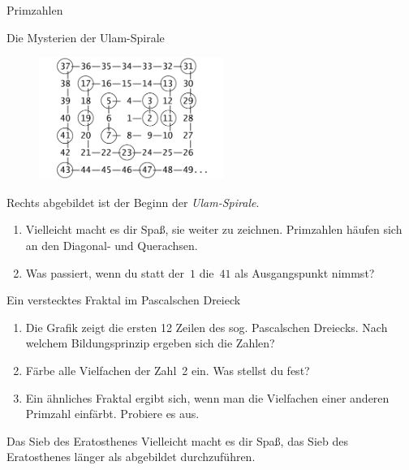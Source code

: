 \documentclass{uebblatt}
\begin{document}
\begin{blatt}{Primzahlen}

\begin{aufgabe}{Die Mysterien der Ulam-Spirale}
\begin{figure}
\vspace*{-1.5cm}
\includegraphics[width=6cm]{ulam}
\end{figure}
Rechts abgebildet ist der Beginn der \emph{Ulam-Spirale}. 
\begin{enumerate}
\item Vielleicht macht es dir Spaß, sie weiter zu zeichnen. Primzahlen häufen
sich an den Diagonal- und Querachsen.
\item Was passiert, wenn du statt der~$1$ die~$41$ als Ausgangspunkt nimmst?
\end{enumerate}
\end{aufgabe}

\begin{aufgabe}{Ein verstecktes Fraktal im Pascalschen Dreieck}
\begin{enumerate}
\item Die Grafik zeigt die ersten 12 Zeilen des sog. Pascalschen Dreiecks. Nach
welchem Bildungsprinzip ergeben sich die Zahlen?
\item Färbe alle Vielfachen der Zahl~2 ein. Was stellst du fest?
\item Ein ähnliches Fraktal ergibt sich, wenn man die Vielfachen einer anderen
Primzahl einfärbt. Probiere es aus.
\end{enumerate}
\centering\pascaltriangle
\end{aufgabe}

\enlargethispage{2em}
\begin{aufgabe}{Das Sieb des Eratosthenes}
Vielleicht macht es dir Spaß, das Sieb des Eratosthenes länger als
abgebildet durchzuführen.
\smallskip

\centering
{}
\end{aufgabe}


\end{blatt}
\end{document}
